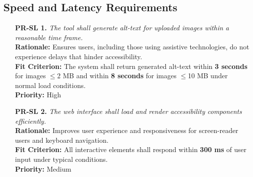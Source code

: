\documentclass[12pt]{article}
\begin{document}
\subsection{Speed and Latency Requirements}
\begin{itemize}
  \item[\textbf{PR-SL 1.}] \textit{The tool shall generate alt-text
    for uploaded images within a reasonable time frame.}\\
    \textbf{Rationale:} Ensures users, including those using
    assistive technologies, do not experience delays that hinder
    accessibility.\\
    \textbf{Fit Criterion:} The system shall return generated
    alt-text within \textbf{3 seconds} for images $\leq$2 MB and
    within \textbf{8 seconds} for images $\leq$10 MB under normal
    load conditions.\\
    \textbf{Priority:} High

  \item[\textbf{PR-SL 2.}] \textit{The web interface shall load and
    render accessibility components efficiently.}\\
    \textbf{Rationale:} Improves user experience and responsiveness
    for screen-reader users and keyboard navigation.\\
    \textbf{Fit Criterion:} All interactive elements shall respond
    within \textbf{300 ms} of user input under typical conditions.\\
    \textbf{Priority:} Medium
\end{itemize}
\end{document}
